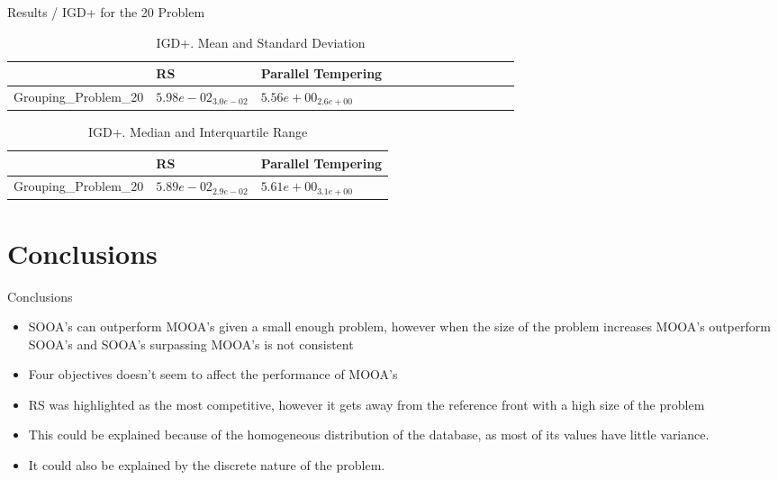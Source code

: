 \documentclass{beamer}
\begin{document}
    \begin{frame}{Results / IGD+ for the 20 Problem}
        \begin{table}
        \caption{IGD+. Mean and Standard Deviation}
        \label{table: IGD+}
        \centering
        \begin{scriptsize}
        \begin{tabular}{lllllllllllll}
        \hline & RS & Parallel Tempering \\
        \hline 
        Grouping\_Problem\_20 & \textbf{$  5.98e-02_{ 3.0e-02}$} & $  5.56e+00_{ 2.6e+00}$  \\
        \hline
        \end{tabular}
        \end{scriptsize}
        \end{table}
        
        \begin{table}
        \caption{IGD+. Median and Interquartile Range}
        \label{table: IGD+}
        \centering
        \begin{scriptsize}
        \begin{tabular}{lll}
        \hline & RS & Parallel Tempering \\
        \hline 
        Grouping\_Problem\_20 & \textbf{$ 5.89e-02_{ 2.9e-02}$} & $5.61e+00_{ 3.1e+00}$ \\
        \hline
        \end{tabular}
        \end{scriptsize}
        \end{table}
    \end{frame}
    
    \section{Conclusions}
    \begin{frame}{Conclusions}
        \begin{itemize}
            \item  SOOA's can outperform MOOA's given a small enough problem, however when the size of the problem increases MOOA's outperform SOOA's and SOOA's surpassing MOOA's is not consistent
            \item Four objectives doesn't seem to affect the performance of MOOA's
            \item RS was highlighted as the most competitive, however it gets away from the reference front with a high size of the problem
            \item This could be explained because of the homogeneous distribution of the database, as most of its  values have little variance.
            \item It could also be explained by the discrete nature of the problem.
        \end{itemize}
    \end{frame}
    
\end{document}
